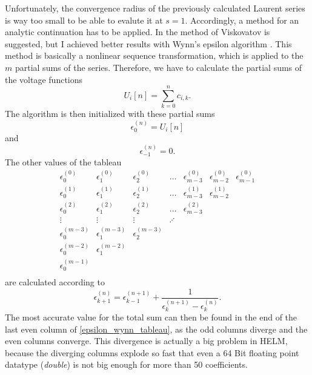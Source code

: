 Unfortunately, the convergence radius of the previously calculated Laurent series is way too small to be able to evalute it at $s = 1$. Accordingly, a method for an analytic continuation has to be applied. In \citep{helmPatentSept2009} the method of Viskovatov is suggested, but I achieved better results with Wynn's epsilon algorithm \citep{epsilonWynn}. This method is basically a nonlinear sequence transformation, which is applied to the $m$ partial sums of the series. Therefore, we have to calculate the partial sums of the voltage functions
\begin{equation}
	U_i[n] = \sum_{k = 0}^n c_{i,k}.
\end{equation}
The algorithm is then initialized with these partial sums
\begin{equation}
	\epsilon_0^{(n)} = U_i[n]
\end{equation}
and
\begin{equation}
	\epsilon_{-1}^{(n)} = 0.
\end{equation}
The other values of the tableau
\begin{equation}
	\begin{matrix}
	\epsilon_0^{(0)}	& \epsilon_1^{(0)}		& \epsilon_2^{(0)}		& \hdots 	& \epsilon_{m-3}^{(0)} 	& \epsilon_{m-2}^{(0)} 	& \epsilon_{m-1}^{(0)} \\
	\epsilon_0^{(1)}	& \epsilon_1^{(1)}		& \epsilon_2^{(1)}		& \hdots 	& \epsilon_{m-3}^{(1)} 	& \epsilon_{m-2}^{(1)} \\
	\epsilon_0^{(2)}	& \epsilon_1^{(2)}		& \epsilon_2^{(2)}		& \hdots 	& \epsilon_{m-3}^{(2)} \\
	\vdots				& \vdots				& \vdots				& \iddots \\
	\epsilon_0^{(m-3)}	& \epsilon_1^{(m-3)}	& \epsilon_2^{(m-3)}	& \\
	\epsilon_0^{(m-2)}	& \epsilon_1^{(m-2)} \\
	\epsilon_0^{(m-1)} \\
	\end{matrix}
	\label{eq:epsilon_wynn_tableau}
\end{equation}
are calculated according to
\begin{equation}
	\epsilon_{k + 1}^{(n)} = \epsilon_{k - 1}^{(n + 1)} + \frac{1}{\epsilon_{k}^{(n + 1)} - \epsilon_{k}^{(n)}}.
	\label{eq:epsilon_wynn}
\end{equation}
The most accurate value for the total sum can then be found in the end of the last even column of \eqref{epsilon_wynn_tableau}, as the odd columns diverge and the even columns converge. This divergence is actually a big problem in HELM, because the diverging columns explode so fast that even a 64 Bit floating point datatype (\emph{double}) is not big enough for more than 50 coefficients.

